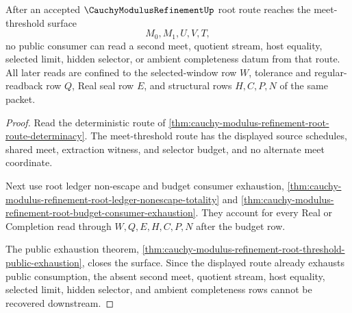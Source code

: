 \begin{theorem}
\label{thm:cauchy-modulus-refinement-meet-threshold-nonescape}
After an accepted $\CauchyModulusRefinementUp$ root route reaches the meet-threshold surface
$$
M_0,M_1,U,V,T,
$$
no public consumer can read a second meet, quotient stream, host equality, selected limit, hidden selector, or ambient completeness datum from that route. All later reads are confined to the selected-window row $W$, tolerance and regular-readback row $Q$, Real seal row $E$, and structural rows $H,C,P,N$ of the same packet.
\end{theorem}
\begin{proof}
Read the deterministic route of \autoref{thm:cauchy-modulus-refinement-root-route-determinacy}. The meet-threshold route has the displayed source schedules, shared meet, extraction witness, and selector budget, and no alternate meet coordinate.

Next use root ledger non-escape and budget consumer exhaustion, \autoref{thm:cauchy-modulus-refinement-root-ledger-nonescape-totality} and \autoref{thm:cauchy-modulus-refinement-root-budget-consumer-exhaustion}. They account for every Real or Completion read through $W,Q,E,H,C,P,N$ after the budget row.

The public exhaustion theorem, \autoref{thm:cauchy-modulus-refinement-root-threshold-public-exhaustion}, closes the surface. Since the displayed route already exhausts public consumption, the absent second meet, quotient stream, host equality, selected limit, hidden selector, and ambient completeness rows cannot be recovered downstream.
\end{proof}

